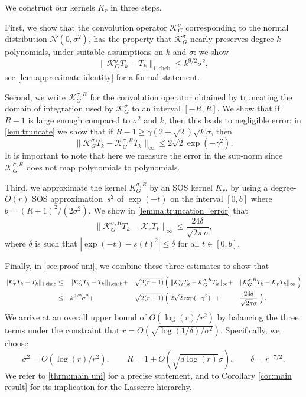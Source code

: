 \documentclass[11pt]{article}
\theoremstyle{definition}
\newcommand{\cheb}{{1,\mathrm{cheb}}}
\begin{document}
We construct our kernels $K_r$ in three steps.

First, we show that the convolution operator $\mathcal K_G^\sigma$ corresponding to the normal distribution $\mathcal N(0,\sigma^2)$, has the property that $\mathcal K_G^\sigma$ nearly preserves degree-$k$ polynomials, under suitable assumptions on $k$ and $\sigma$: we show
\[
\|\mathcal K_G^\sigma T_k - T_k\|_\cheb \leq {k^{9/2}\sigma^2},
\]
see \cref{lem:approximate identity} for a formal statement.

Second, we write $\mathcal K_G^{\sigma,R}$ for the convolution operator obtained by truncating the domain of integration used by $\mathcal K_G^\sigma$ to an interval $[-R,R]$. We show that if $R-1$ is large enough compared to $\sigma^2$ and $k$, then this leads to negligible error: in \cref{lem:truncate} we show that if $R-1 \geq \gamma (2+\sqrt{2}) \sqrt{k} \sigma$, then
\[
\|\mathcal K_G^{\sigma} T_k - \mathcal K_G^{\sigma,R} T_k \|_\infty \leq 2\sqrt{2} \exp(-\gamma^2).
\]
It is important to note that here we measure the error in the sup-norm since $\mathcal K_G^{\sigma,R}$ does not map polynomials to polynomials.

Third, we approximate the kernel $K_G^{\sigma,R}$ by an SOS kernel $K_r$, by using a degree-$O(r)$ SOS approximation~$s^2$ of $\exp(-t)$ on the interval $[0,b]$ where $b = (R+1)^2/(2\sigma^2)$. We show in \cref{lemma:truncation_error} that
\[
\|\mathcal K_G^{\sigma,R}T_k - \mathcal K_r T_k \|_\infty \leq
\frac{24\delta}{\sqrt{2\pi}\sigma},
\]
where $\delta$ is such that $|\exp(-t)- s(t)^2| \leq \delta$ for all $t \in [0,b]$.


Finally, in \cref{sec:proof uni}, we combine these three estimates to show that
\begin{align*}
\|\mathcal K_r T_k - T_k \|_\cheb &\leq &&\|\mathcal K_G^\sigma T_k - T_k\|_\cheb + &&\sqrt{2(r+1)} \left(\vphantom{\|\mathcal K_G^\sigma T_k - \mathcal K_G^{\sigma,R} T_k \|_\infty}\right. \|\mathcal K_G^\sigma T_k - \mathcal K_G^{\sigma,R} T_k \|_\infty + &&\|\mathcal K_G^{\sigma, R} T_k - \mathcal K_r T_k\|_\infty \left.\vphantom{\|\mathcal K_G^\sigma T_k - \mathcal K_G^{\sigma,R} T_k \|_\infty} \right) \\
&\leq &&{k^{9/2}\sigma^2} + &&\sqrt{2(r+1)} \left(\vphantom{\|\mathcal K_G^\sigma T_k - \mathcal K_G^{\sigma,R} T_k \|_\infty}\right. 2\sqrt{2}\exp(-\gamma^2) \ \  + &&\frac{24\delta}{\sqrt{2\pi}\sigma} \left.\vphantom{\|\mathcal K_G^\sigma T_k - \mathcal K_G^{\sigma,R} T_k \|_\infty}\right).
\end{align*}
We arrive at an overall upper bound of $O(\log(r)/r^2)$ by balancing the three
terms under the constraint that $r = O(\sqrt{\log(1/\delta)/\sigma^2})$. Specifically, we choose
\begin{equation*} %
\sigma^2= O(\log(r)/r^2), \qquad R = 1 + O(\sqrt{d\log(r)}\sigma), \qquad {\delta= r^{-7/2}}.
\end{equation*}
We refer to \cref{thrm:main uni} for a precise statement, and to Corollary \ref{cor:main result} for its implication for the Lasserre hierarchy.
\end{document}
